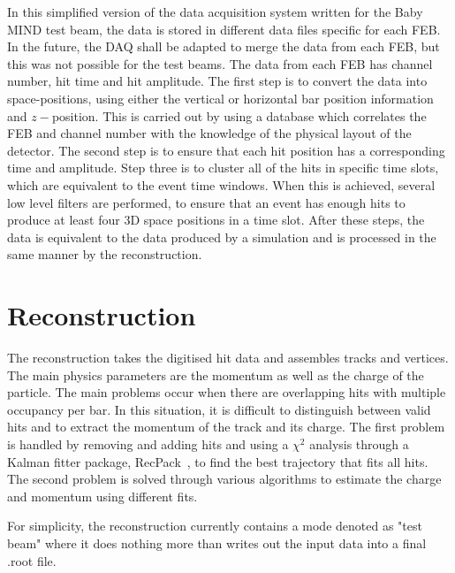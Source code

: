
In this simplified version of the data acquisition system written for the Baby MIND test beam, the data is stored in different data files specific for each FEB. In the future, the DAQ shall be adapted to merge the data from each FEB, but this was not possible for the test beams. The data from each FEB has channel number, hit time and hit amplitude. The first step is to convert the data into space-positions, using either the vertical or horizontal bar position information and $z-$position. This is carried out by using a database which correlates the FEB and channel number with the knowledge of the physical layout of the detector. The second step is to ensure that each hit position has a corresponding time and amplitude. Step three is to cluster all of the hits in specific time slots, which are equivalent to the event time windows. When this is achieved, several low level filters are performed, to ensure that an event has enough hits to produce at least four 3D space positions in a time slot. After these steps, the data is equivalent to the data produced by a simulation and is processed in the same manner by the reconstruction.%

\section{Reconstruction}\label{sec:reconstruction}
The reconstruction takes the digitised hit data and assembles tracks and vertices. The main physics parameters are the momentum as well as the charge of the particle. The main problems occur when there are overlapping hits with multiple occupancy per bar. In this situation, it is difficult to distinguish between valid hits and to extract the momentum of the track and its charge.
The first problem is handled by removing and adding hits and using a $\chi^2$ analysis through a Kalman fitter package, RecPack~\cite{RecPack}, to find the best trajectory that fits all hits. The second problem is solved through various algorithms to estimate the charge and momentum using different fits.

For simplicity, the reconstruction currently contains a mode denoted as "test beam" where it does nothing more than writes out the input data into a final .root file.

